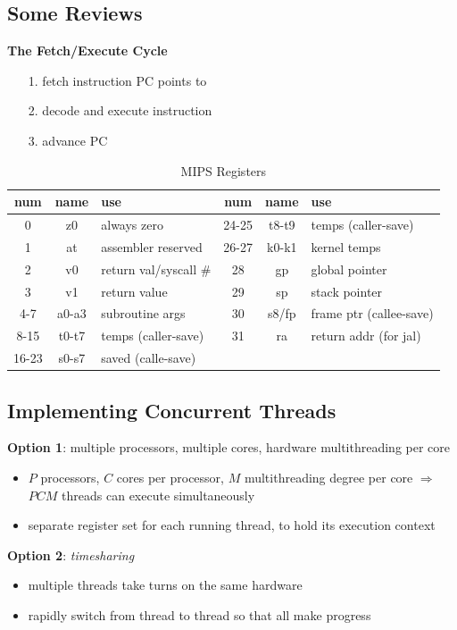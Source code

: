 \documentclass[12pt]{article}
\theoremstyle{plain}
\theoremstyle{definition}
\begin{document}
\subsection{Some Reviews}
\textbf{The Fetch/Execute Cycle}
\begin{enumerate}
  \item[1.] fetch instruction PC points to
  \item[2.] decode and execute instruction
  \item[3.] advance PC
\end{enumerate}

\begin{table}[ht]
  \caption{MIPS Registers}
  \centering

  \begin{tabular}{|c|c|l||c|c|l|}
  \hline
  num & name & use & num & name & use \\ \hline
  0 & z0 & always zero & 24-25 & t8-t9 & temps (caller-save) \\ \hline
  1 & at & assembler reserved & 26-27 & k0-k1 & kernel temps \\ \hline
  2 & v0 & return val/syscall \# & 28 & gp & global pointer \\ \hline
  3 & v1 & return value & 29 & sp & stack pointer \\ \hline
  4-7 & a0-a3 & subroutine args & 30 & s8/fp & frame ptr (callee-save) \\ \hline
  8-15 & t0-t7 & temps (caller-save) & 31 & ra & return addr (for jal) \\ \hline
  16-23 & s0-s7 & saved (calle-save) & & &  \\ \hline
  \end{tabular}
\end{table}

\subsection{Implementing Concurrent Threads}
\textbf{Option 1}: multiple processors, multiple cores, hardware multithreading per core
\begin{itemize}
  \item $P$ processors, $C$ cores per processor, $M$ multithreading degree per core $\Rightarrow$ $PCM$ threads can execute simultaneously
  \item separate register set for each running thread, to hold its execution context
\end{itemize}
\textbf{Option 2}: \emph{timesharing}
\begin{itemize}
  \item multiple threads take turns on the same hardware
  \item rapidly switch from thread to thread so that all make progress
\end{itemize}
\end{document}
